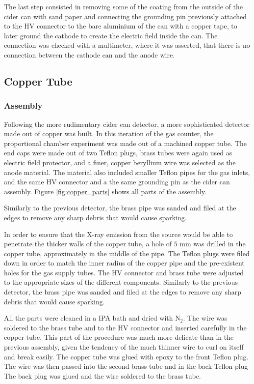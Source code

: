 The last step consisted in removing some of the coating from the outside of the
cider can with sand paper and connecting the grounding pin previously attached
to the HV connector to the bare aluminium of the can with a copper tape, to
later ground the cathode to create the electric field inside the can. The
connection was checked with a multimeter, where it was asserted, that there is
no connection between the cathode can and the anode wire.

\subsection{Copper Tube}
\subsubsection{Assembly}
Following the more rudimentary cider can detector, a more sophisticated detector made out of copper was built. In this iteration of the gas counter, the  proportional chamber experiment was made out of a machined copper tube. The end caps were made out of two Teflon plugs, brass tubes were again used as electric field protector, and a finer, copper beryllium wire was selected as the anode material. The material also included smaller Teflon pipes for the gas inlets, and the same HV connector and a the same grounding pin as the cider can assembly. Figure \ref{fig:copper_parts} shows all parts of the assembly.

Similarly to the previous detector, the brass pipe was sanded and filed at the edges to remove any sharp debris that would cause sparking.

In order to ensure that the X-ray emission from the source would be able to penetrate the thicker walls of the copper tube, a hole of $5$ mm was drilled in the copper tube, approximately in the middle of the pipe. The Teflon plugs were filed down in order to match the inner radius of the copper pipe and the pre-existent holes for the gas supply tubes. The HV connector and brass tube were adjusted to the appropriate sizes of the different components. Similarly to the previous detector, the brass pipe was sanded and filed at the edges to remove any sharp debris that would cause sparking.

All the parts were cleaned in a IPA bath and dried with N$_2$. The wire was soldered to the brass tube and to the HV connector and inserted carefully in the copper tube. This part of the procedure was much more delicate than in the previous assembly, given the tendency of the much thinner wire to curl on itself and break easily. The copper tube was glued with epoxy to the front Teflon plug. The wire was then passed into the second brass tube and in the back Teflon plug  The back plug was glued and the wire soldered to the brass tube.

